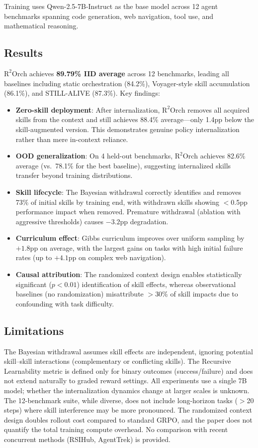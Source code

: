 \documentclass[11pt,a4paper]{article}
\begin{document}
Training uses Qwen-2.5-7B-Instruct as the base model across 12 agent benchmarks spanning code generation, web navigation, tool use, and mathematical reasoning.

\subsection{Results}
$\mathrm{R^2Orch}$ achieves \textbf{89.79\% IID average} across 12 benchmarks, leading all baselines including static orchestration (84.2\%), Voyager-style skill accumulation (86.1\%), and STILL-ALIVE (87.3\%). Key findings:

\begin{itemize}
  \item \textbf{Zero-skill deployment}: After internalization, $\mathrm{R^2Orch}$ removes all acquired skills from the context and still achieves 88.4\% average---only 1.4pp below the skill-augmented version. This demonstrates genuine policy internalization rather than mere in-context reliance.
  \item \textbf{OOD generalization}: On 4 held-out benchmarks, $\mathrm{R^2Orch}$ achieves 82.6\% average (vs.\ 78.1\% for the best baseline), suggesting internalized skills transfer beyond training distributions.
  \item \textbf{Skill lifecycle}: The Bayesian withdrawal correctly identifies and removes 73\% of initial skills by training end, with withdrawn skills showing $<$0.5pp performance impact when removed. Premature withdrawal (ablation with aggressive thresholds) causes $-3.2$pp degradation.
  \item \textbf{Curriculum effect}: Gibbs curriculum improves over uniform sampling by $+1.8$pp on average, with the largest gains on tasks with high initial failure rates (up to $+4.1$pp on complex web navigation).
  \item \textbf{Causal attribution}: The randomized context design enables statistically significant ($p < 0.01$) identification of skill effects, whereas observational baselines (no randomization) misattribute $>$30\% of skill impacts due to confounding with task difficulty.
\end{itemize}

\subsection{Limitations}
The Bayesian withdrawal assumes skill effects are independent, ignoring potential skill--skill interactions (complementary or conflicting skills). The Recursive Learnability metric is defined only for binary outcomes (success/failure) and does not extend naturally to graded reward settings. All experiments use a single 7B model; whether the internalization dynamics change at larger scales is unknown. The 12-benchmark suite, while diverse, does not include long-horizon tasks ($>$20 steps) where skill interference may be more pronounced. The randomized context design doubles rollout cost compared to standard GRPO, and the paper does not quantify the total training compute overhead. No comparison with recent concurrent methods (RSIHub, AgentTrek) is provided.
\end{document}
